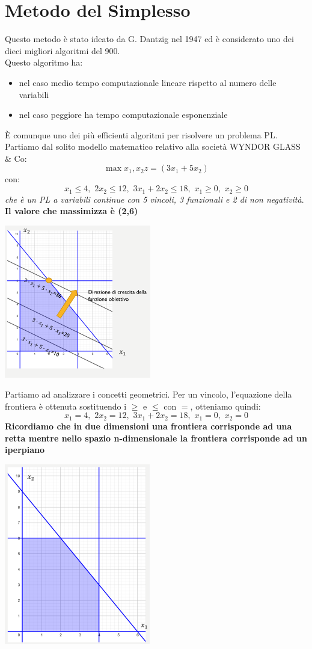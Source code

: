 \documentclass[a4paper,12pt, oneside]{book}
\begin{document}
\section{Metodo del Simplesso}
Questo metodo è stato ideato da G. Dantzig nel 1947 ed è considerato
uno dei dieci migliori algoritmi del 900.\\
Questo algoritmo ha:
\begin{itemize}
  \item nel caso medio tempo computazionale lineare rispetto al numero
  delle variabili
  \item nel caso peggiore ha tempo computazionale esponenziale
\end{itemize}
È comunque uno dei più efficienti algoritmi per risolvere un problema
PL.\\
Partiamo dal solito modello matematico relativo alla società
WYNDOR GLASS \& Co:
\[\max{x_1,x_2} z= (3x_1+5x_2)\]
con:
\[x_1\leq 4,\,\,2x_2\leq 12,\,\,3x_1+2x_2\leq 18,\,\,x_1\geq 0,\,\,
  x_2\geq 0\]
\textit{che è un PL a variabili continue con 5 vincoli, 3 funzionali e
  2 di non negatività}. \textbf{Il valore che massimizza è (2,6)}
\begin{center}
  \includegraphics[scale = 0.8]{img/simp.png}
\end{center}
Partiamo ad analizzare i concetti geometrici. Per un vincolo,
l’equazione della frontiera è ottenuta sostituendo i $\geq$ e $\leq$
con $=$, otteniamo quindi:
\[x_1= 4,\,\,2x_2= 12,\,\,3x_1+2x_2= 18,\,\,x_1= 0,\,\,
  x_2= 0\]
\textbf{Ricordiamo che in due dimensioni una frontiera corrisponde ad
  una retta mentre nello spazio n-dimensionale la frontiera corrisponde ad un
  iperpiano}
\begin{center}
  \includegraphics[scale = 0.8]{img/simp2.png}
\end{center}
\end{document}
